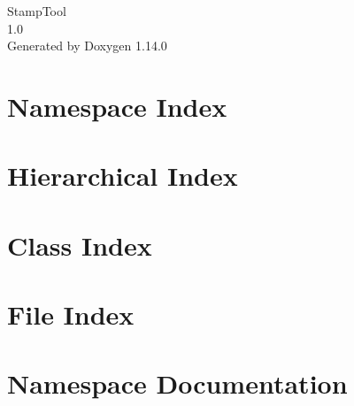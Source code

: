 \documentclass[twoside]{book}
\newcommand{\+}{\discretionary{\mbox{\scriptsize$\hookleftarrow$}}{}{}}
\newcommand{\clearemptydoublepage}{%
    \newpage{\pagestyle{empty}\cleardoublepage}%
  }
\begin{document}
  \raggedbottom
    \hypersetup{pageanchor=false,
                bookmarksnumbered=true,
                pdfencoding=unicode
               }
  \begin{titlepage}
  \vspace*{7cm}
  \begin{center}%
  {\Large Stamp\+Tool}\\
  [1ex]\large 1.\+0 \\
  \vspace*{1cm}
  {\large Generated by Doxygen 1.14.0}\\
  \end{center}
  \end{titlepage}
  \clearemptydoublepage
  \tableofcontents
  \clearemptydoublepage
  \hypersetup{pageanchor=true}


\chapter{Namespace Index}

\chapter{Hierarchical Index}

\chapter{Class Index}

\chapter{File Index}

\chapter{Namespace Documentation}




\end{document}
